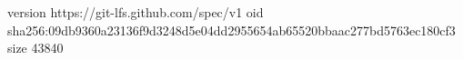 version https://git-lfs.github.com/spec/v1
oid sha256:09db9360a23136f9d3248d5e04dd2955654ab65520bbaac277bd5763ec180cf3
size 43840
